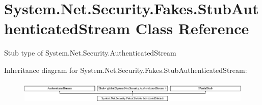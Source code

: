 \hypertarget{class_system_1_1_net_1_1_security_1_1_fakes_1_1_stub_authenticated_stream}{\section{System.\-Net.\-Security.\-Fakes.\-Stub\-Authenticated\-Stream Class Reference}
\label{class_system_1_1_net_1_1_security_1_1_fakes_1_1_stub_authenticated_stream}
}


Stub type of System.\-Net.\-Security.\-Authenticated\-Stream 


Inheritance diagram for System.\-Net.\-Security.\-Fakes.\-Stub\-Authenticated\-Stream\-:\begin{figure}[H]
\begin{center}
\leavevmode
\includegraphics[height=1.085271cm]{class_system_1_1_net_1_1_security_1_1_fakes_1_1_stub_authenticated_stream}
\end{center}
\end{figure}
